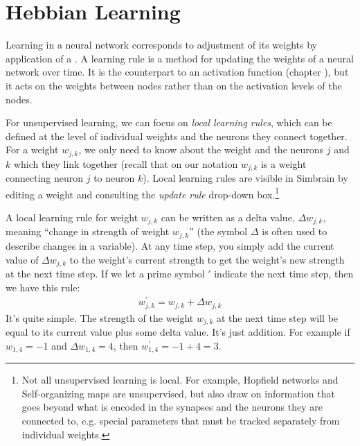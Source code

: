 \section{Hebbian Learning}




Learning in a neural network corresponds to adjustment of its weights by application of a . A learning rule is a method for updating the weights of a neural network over time. It is the counterpart to an activation function (chapter ), but it acts on the weights between nodes rather than on the activation levels of the nodes. 


For unsupervised learning, we can focus on \emph{local learning rules}, which can be defined at the level of individual weights and the neurons they connect together. For a weight $w_{j,k}$, we only need to know about the weight and the neurons $j$ and $k$ which they link together (recall that on our notation $w_{j,k}$ is a weight connecting neuron $j$ to neuron $k$). Local learning rules are visible in Simbrain by editing a weight and consulting the \emph{update  rule} drop-down box.\footnote{Not all unsupervised learning is local. For example, Hopfield networks and Self-organizing maps are unsupervised, but also draw on information that goes beyond what is encoded in the synapses and the neurons they are connected to, e.g. special parameters that must be tracked separately from individual weights.}

A local learning rule for weight $w_{j,k}$  can be written as a delta value,
$\Delta w_{j,k}$, meaning ``change in strength of weight $w_{j,k}$'' (the symbol $\Delta$ is often used to describe changes in a variable). At any
time step, you simply add the current value of $\Delta w_{j,k}$ to the weight's 
current strength to get the weight's new strength at the next time step. If we let a prime symbol $\prime$ indicate the next time step, then we have this rule:
\begin{eqnarray*}
w^\prime_{j,k} = w_{j,k} + \Delta w_{j,k}
\end{eqnarray*}
It's quite simple. The strength of the weight $w_{j,k}$ at the next time step will be equal to its current value plus some delta value. It's just addition. For example if $w_{1,4} =-1$ and $\Delta w_{1,4} = 4$, then $w^\prime_{1,4}  = -1 + 4 = 3$. 

